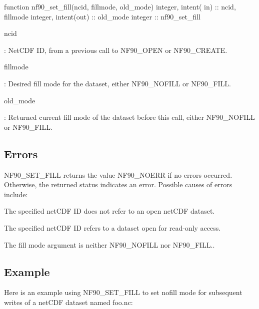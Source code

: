 \begin{DoxyCode}
\textcolor{keyword}{function }nf90\_set\_fill(ncid, fillmode, old\_mode)
  \textcolor{keywordtype}{integer}, \textcolor{keywordtype}{intent( in)} :: ncid, fillmode
  \textcolor{keywordtype}{integer}, \textcolor{keywordtype}{intent(out)} :: old\_mode
  \textcolor{keywordtype}{integer}              :: nf90\_set\_fill
\end{DoxyCode}


{\ttfamily ncid}

\+: Net\+C\+DF ID, from a previous call to N\+F90\+\_\+\+O\+P\+EN or N\+F90\+\_\+\+C\+R\+E\+A\+TE.

{\ttfamily fillmode}

\+: Desired fill mode for the dataset, either N\+F90\+\_\+\+N\+O\+F\+I\+LL or N\+F90\+\_\+\+F\+I\+LL.

{\ttfamily old\+\_\+mode}

\+: Returned current fill mode of the dataset before this call, either N\+F90\+\_\+\+N\+O\+F\+I\+LL or N\+F90\+\_\+\+F\+I\+LL.

\subsection*{Errors}

N\+F90\+\_\+\+S\+E\+T\+\_\+\+F\+I\+LL returns the value N\+F90\+\_\+\+N\+O\+E\+RR if no errors occurred. Otherwise, the returned status indicates an error. Possible causes of errors include\+:


\begin{DoxyItemize}
\item The specified net\+C\+DF ID does not refer to an open net\+C\+DF dataset.
\item The specified net\+C\+DF ID refers to a dataset open for read-\/only access.
\item The fill mode argument is neither N\+F90\+\_\+\+N\+O\+F\+I\+LL nor N\+F90\+\_\+\+F\+I\+LL..
\end{DoxyItemize}

\subsection*{Example}

Here is an example using N\+F90\+\_\+\+S\+E\+T\+\_\+\+F\+I\+LL to set nofill mode for subsequent writes of a net\+C\+DF dataset named foo.\+nc\+:


